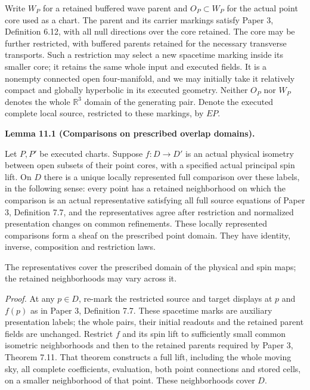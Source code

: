 \documentclass[
  english,
  11pt,
  reqno]{amsart}
\makeatletter
\newcounter{none} %
\newcommand{\pandocstatementheading}[1]{%
  \par\if@nobreak\else
    \addpenalty{\@beginparpenalty}%
    \addvspace{.5\baselineskip plus .2\baselineskip minus .2\baselineskip}%
  \fi
  {\normalfont\bfseries #1\par}%
  \nobreak\@afterindenttrue\@afterheading
}
\makeatother
\begin{document}
Write \(W_P\) for a retained buffered wave parent and \(O_P\subset W_P\)
for the actual point core used as a chart. The parent and its carrier
markings satisfy Paper 3, Definition 6.12, with all null directions over
the core retained. The core may be further restricted, with buffered
parents retained for the necessary transverse transports. Such a
restriction may select a new spacetime marking inside its smaller core;
it retains the same whole input and executed fields. It is a nonempty
connected open four-manifold, and we may initially take it relatively
compact and globally hyperbolic in its executed geometry. Neither
\(O_P\) nor \(W_P\) denotes the whole \(\mathbb R^3\) domain of the
generating pair. Denote the executed complete local source, restricted
to these markings, by \(E P\).

\pandocstatementheading{\protect{}\label{lem:ordinary-atlas-local-comparison-sheaf}Lemma 11.1 (Comparisons on prescribed overlap domains).}

Let \(P,P'\) be executed charts. Suppose \(f:D\to D'\) is an actual
physical isometry between open subsets of their point cores, with a
specified actual principal spin lift. On \(D\) there is a unique locally
represented full comparison over these labels, in the following sense:
every point has a retained neighborhood on which the comparison is an
actual representative satisfying all full source equations of Paper 3,
Definition 7.7, and the representatives agree after restriction and
normalized presentation changes on common refinements. These locally
represented comparisons form a sheaf on the prescribed point domain.
They have identity, inverse, composition and restriction laws.

The representatives cover the prescribed domain of the physical and spin
maps; the retained neighborhoods may vary across it.

\emph{Proof.} At any \(p\in D\), re-mark the restricted source and
target displays at \(p\) and \(f(p)\) as in Paper 3, Definition 7.7. These spacetime marks are
auxiliary presentation labels; the whole pairs, their initial readouts
and the retained parent fields are unchanged. Restrict \(f\) and its
spin lift to sufficiently small common isometric neighborhoods and then
to the retained parents required by Paper 3, Theorem 7.11. That theorem
constructs a full lift, including the whole moving sky, all complete
coefficients, evaluation, both point connections and stored cells, on a
smaller neighborhood of that point. These neighborhoods cover \(D\).
\end{document}
